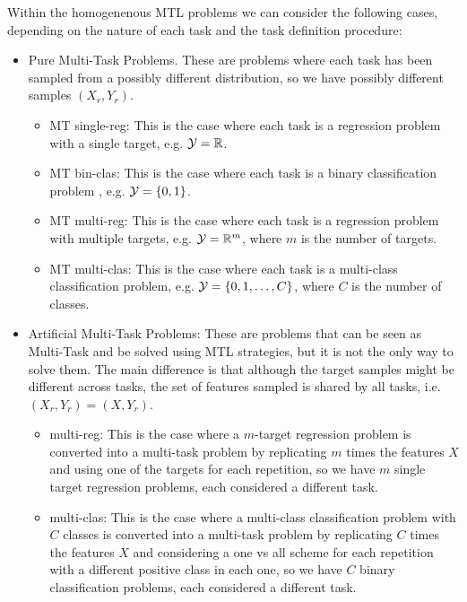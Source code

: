 Within the homogenenous MTL problems we can consider the following cases, depending on the nature of each task and the task definition procedure:
\begin{itemize}
    \item Pure Multi-Task Problems. These are problems where each task has been sampled from a possibly different distribution, so we have possibly different samples $(X_r, Y_r)$.
    \begin{itemize}
        \item MT single-reg: This is the case where each task is a regression problem with a single target, e.g. $\mathcal{Y} = \mathbb{R}$. 
        \item MT bin-clas: This is the case where each task is a binary classification problem , e.g. $\mathcal{Y} = \left\{0, 1\right\}$. 
        \item MT multi-reg: This is the case where each task is a regression problem with multiple targets, e.g. $\mathcal{Y} = \mathbb{R}^m$, where $m$ is the number of targets. 
        \item MT multi-clas: This is the case where each task is a multi-class classification problem, e.g. $\mathcal{Y} = \left\{0, 1, \ldots, C\right\}$, where $C$ is the number of classes.
    \end{itemize}
    \item Artificial Multi-Task Problems: These are problems that can be seen as Multi-Task and be solved using MTL strategies, but it is not the only way to solve them. The main difference is that although the target samples might be different across tasks, the set of features sampled is shared by all tasks, i.e. $(X_r, Y_r) = (X, Y_r)$.
    \begin{itemize}
        \item multi-reg: This is the case where a $m$-target regression problem is converted into a multi-task problem by replicating $m$ times the features $X$ and using one of the targets for each repetition, so we have $m$ single target regression problems, each considered a different task.
        \item multi-clas: This is the case where a multi-class classification problem with $C$ classes is converted into a multi-task problem by replicating $C$ times the features $X$ and considering a one vs all scheme for each repetition with a different positive class in each one, so we have $C$ binary classification problems, each considered a different task.
    \end{itemize}
\end{itemize}

